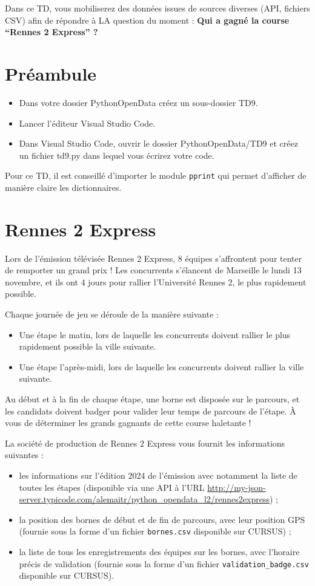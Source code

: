 \documentclass[11pt,a4paper]{article}
\begin{document}
Dans ce TD, vous mobiliserez des données issues de sources diverses (API, fichiers CSV) afin de répondre à LA question du moment : \textbf{Qui a gagné la course ``Rennes 2 Express'' ?}

\section*{Préambule}
\begin{itemize}
    \item Dans votre dossier PythonOpenData créez un sous-dossier TD9.
    \item Lancer l'éditeur Visual Studio Code.
    \item Dans Visual Studio Code, ouvrir le dossier PythonOpenData/TD9 et créez un fichier td9.py dans lequel vous écrirez votre code. 
\end{itemize}

Pour ce TD, il est conseillé d'importer le module \verb+pprint+ qui permet d'afficher de manière claire les dictionnaires.

\section*{Rennes 2 Express}

Lors de l'émission télévisée Rennes 2 Express, 8 équipes s'affrontent pour tenter de remporter un grand prix !
Les concurrents s'élancent de Marseille le lundi 13 novembre, et ils ont 4 jours pour rallier l'Université Rennes 2, le plus rapidement possible.

Chaque journée de jeu se déroule de la manière suivante :
\begin{itemize}
    \item Une étape le matin, lors de laquelle les concurrents doivent rallier le plus rapidement possible la ville suivante.
    \item Une étape l'après-midi, lors de laquelle les concurrents doivent rallier la ville suivante.
\end{itemize}

Au début et à la fin de chaque étape, une borne est disposée sur le parcours, et les candidats doivent badger pour valider leur temps de parcours de l'étape.
À vous de déterminer les grands gagnants de cette course haletante !

La société de production de Rennes 2 Express vous fournit les informations suivantes : 
\begin{itemize}
    \item les informations sur l'édition 2024 de l'émission avec notamment la liste de toutes les étapes (disponible via une API à l'URL \url{http://my-json-server.typicode.com/alemaitr/python\_opendata\_l2/rennes2express}) ;
    \item la position des bornes de début et de fin de parcours, avec leur position GPS (fournie sous la forme d'un fichier \texttt{bornes.csv} disponible sur CURSUS) ;
    \item la liste de tous les enregistrements des équipes sur les bornes, avec l'horaire précis de validation (fournie sous la forme d'un fichier \texttt{validation\_badge.csv} disponible sur CURSUS).
\end{itemize}
\end{document}
